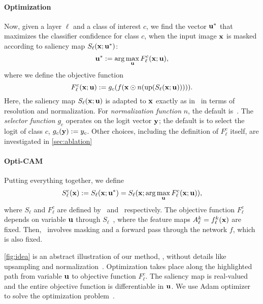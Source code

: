 
\paragraph{Optimization}

Now, given a layer $\ell$ and a class of interest $c$, we find the vector $\mathbf{u}^*$ that maximizes the classifier confidence for class $c$, when the input image $\mathbf{x}$ is masked according to saliency map $S_\ell(\mathbf{x}; \mathbf{u}^*)$:
\begin{equation}
	\mathbf{u}^* \mathrel{:=} \arg\max_{\mathbf{u}} F^c_\ell(\mathbf{x}; \mathbf{u}),
\label{eq:opt}
\end{equation}
where we define the objective function
\begin{equation}
	F^c_\ell(\mathbf{x}; \mathbf{u}) \mathrel{:=} g_c(f(\mathbf{x} \odot n(\operatorname{up}(S_\ell(\mathbf{x}; \mathbf{u}))))).
\label{eq:obj}
\end{equation}
Here, the saliency map $S_\ell(\mathbf{x}; \mathbf{u})$ is adapted to $\mathbf{x}$ exactly as in~ in terms of resolution and normalization. For \emph{normalization function} $n$, the default is~. The \emph{selector function} $g_c$ operates on the logit vector $\mathbf{y}$; the default is to select the logit of class $c$, \ie $g_c(\mathbf{y}) \mathrel{:=} y_c$. Other choices, including the definition of $F^c_\ell$ itself, are investigated in \autoref{sec:ablation} 


\paragraph{Opti-CAM}

Putting everything together, we define
\begin{equation}
	S^c_\ell(\mathbf{x}) \mathrel{:=} S_\ell(\mathbf{x}; \mathbf{u}^*) = S_\ell(\mathbf{x}; \arg\max_{\mathbf{u}} F^c_\ell(\mathbf{x}; \mathbf{u})),
\label{eq:o-sal}
\end{equation}
where $S_\ell$ and $F^c_\ell$ are defined by~ and~ respectively. The objective function $F^c_\ell$~ depends on variable $\mathbf{u}$ through $S_\ell$~, where the feature maps $A^k_\ell = f^k_\ell(\mathbf{x})$ are fixed. Then,~ involves masking and a forward pass through the network $f$, which is also fixed.

\autoref{fig:idea} is an abstract illustration of our method, , without details like upsampling and normalization~. Optimization takes place along the highlighted path from variable $\mathbf{u}$ to objective function $F^c_\ell$. The saliency map is real-valued and the entire objective function is differentiable in $\mathbf{u}$. We use Adam optimizer~\citep{kingma2014adam} to solve the optimization problem~.

